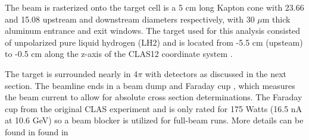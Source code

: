              

            The beam is rasterized onto the target cell  is a 5 cm long Kapton cone with 23.66 and 15.08 upstream and downstream diameters respectively, with 30 $\mu$m thick aluminum entrance and exit windows. The target used for this analysis consisted of unpolarized pure liquid hydrogen (LH2) and is located from -5.5 cm (upsteam) to -0.5 cm along the z-axis of the CLAS12 coordinate system \parencite{Baltzell2020ThePerformance}. 
            

            The target is surrounded nearly in 4$\pi$ with detectors as discussed in the next section. The beamline ends in a beam dump and Faraday cup , which measures the beam current to allow for absolute cross section determinations. The Faraday cup from the original CLAS experiment and is only rated for 175 Watts (16.5 nA at 10.6 GeV) so a beam blocker is utilized for full-beam runs. More details can be found in found in \parencite{Mecking2003TheCLAS} %
            
  
    
